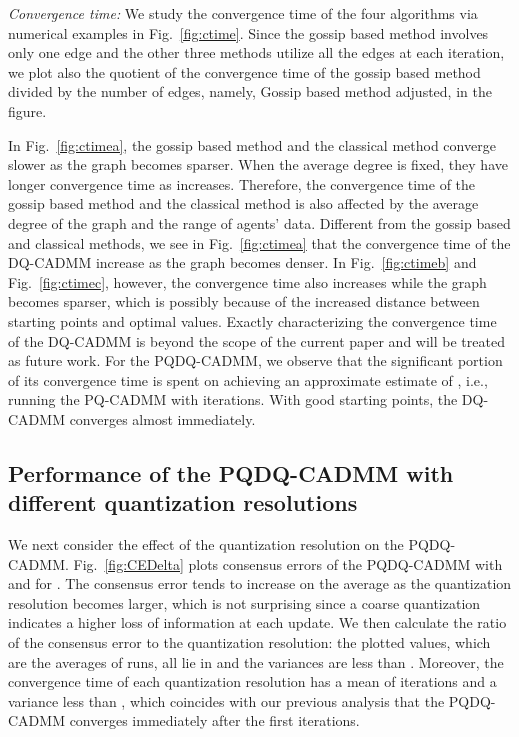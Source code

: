 \documentclass[journal]{IEEEtran}
\begin{document}
{\it Convergence time:} We study the convergence time of the four algorithms via numerical examples in Fig.~\ref{fig:ctime}. Since the gossip based method involves only one edge and the other three methods utilize all the edges at each iteration, we plot also the quotient of the convergence time of the gossip based method divided by the number of edges, namely, Gossip based method adjusted, in the figure. 

In Fig.~\ref{fig:ctimea}, the gossip based method and the classical method converge slower as the graph becomes sparser. When the average degree is fixed, they have longer convergence time as  increases. Therefore, the convergence time of the gossip based method and the classical method is also affected by the average degree of the graph and the range of agents' data. Different from the gossip based and classical methods, we see in Fig.~\ref{fig:ctimea} that the convergence time of the DQ-CADMM increase as the graph becomes denser. In Fig.~\ref{fig:ctimeb} and Fig.~\ref{fig:ctimec}, however, the convergence time also increases while the graph becomes sparser, which is possibly because of the increased distance between starting points and optimal values. Exactly characterizing the convergence time of the DQ-CADMM is beyond the scope of the current paper and will be treated as future work. For the PQDQ-CADMM, we observe that the significant portion of its convergence time is spent on achieving an approximate estimate of , i.e., running the PQ-CADMM with  iterations. With good starting points, the DQ-CADMM converges almost immediately. 

\subsection{Performance of the PQDQ-CADMM with different quantization resolutions}
We next consider the effect of the quantization resolution on the PQDQ-CADMM. Fig.~\ref{fig:CEDelta} plots consensus errors of the PQDQ-CADMM with  and  for . The consensus error tends to increase on the average as the quantization resolution becomes larger, which is not surprising since a coarse quantization indicates a higher loss of information at each update. We then calculate the ratio of the consensus error to the quantization resolution: the plotted values, which are the averages of  runs, all lie in  and the variances are less than . Moreover, the convergence time of each quantization resolution has a mean of  iterations and a variance less than , which coincides with our previous analysis that the PQDQ-CADMM converges immediately after the first  iterations.
\end{document}
